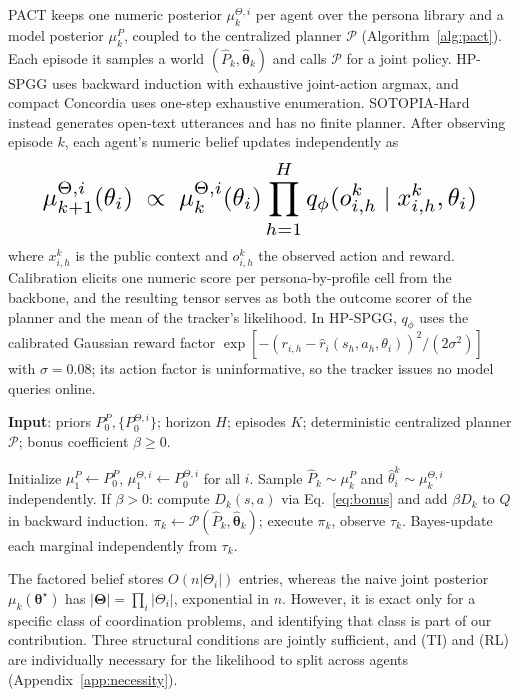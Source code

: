 \documentclass[letterpaper]{article} %
\begin{document}
PACT keeps one numeric posterior $\mu_k^{\Theta,i}$ per agent over the persona library and a model posterior $\mu_k^P$, coupled to the centralized planner $\mathcal P$ (Algorithm~\ref{alg:pact}). Each episode it samples a world $(\hat P_k, \hat{\boldsymbol\theta}_k)$ and calls $\mathcal P$ for a joint policy. HP-SPGG uses backward induction with exhaustive joint-action argmax, and compact Concordia uses one-step exhaustive enumeration. SOTOPIA-Hard instead generates open-text utterances and has no finite planner. After observing episode $k$, each agent's numeric belief updates independently as
\begin{equation}
\label{eq:likelihood}
\resizebox{0.90\linewidth}{!}{$\displaystyle
\mu_{k+1}^{\Theta,i}(\theta_i) \;\propto\; \mu_k^{\Theta,i}(\theta_i)\prod_{h=1}^{H} q_\phi(o_{i,h}^k\mid x_{i,h}^k,\theta_i)
$}
\end{equation}
where $x_{i,h}^k$ is the public context and $o_{i,h}^k$ the observed action and reward. Calibration elicits one numeric score per persona-by-profile cell from the backbone, and the resulting tensor serves as both the outcome scorer of the planner and the mean of the tracker's likelihood. In HP-SPGG, $q_\phi$ uses the calibrated Gaussian reward factor $\exp[-(r_{i,h}-\hat r_i(s_h,a_h,\theta_i))^2/(2\sigma^2)]$ with $\sigma{=}0.08$; its action factor is uninformative, so the tracker issues no model queries online.

\begin{algorithm}[t]
\caption{PACT (idealized PACT\textsuperscript{+} uses Eq.~\ref{eq:bonus}; experiments use the disclosed proxy)}\label{alg:pact}
\textbf{Input}: priors $P_0^P, \{P_0^{\Theta,i}\}$; horizon $H$; episodes $K$; deterministic centralized planner $\mathcal P$; bonus coefficient $\beta\geq 0$.\\
\begin{algorithmic}[1]
\STATE Initialize $\mu_1^P\!\gets\! P_0^P$, $\mu_1^{\Theta,i}\!\gets\! P_0^{\Theta,i}$ for all $i$.
  \STATE Sample $\hat P_k\!\sim\!\mu_k^P$ and $\hat\theta_i^k\!\sim\!\mu_k^{\Theta,i}$ independently.
  \STATE If $\beta>0$: compute $D_k(s,a)$ via Eq.~\eqref{eq:bonus} and add $\beta D_k$ to $Q$ in backward induction.
  \STATE $\pi_k\gets\mathcal P(\hat P_k,\hat{\boldsymbol\theta}_k)$; execute $\pi_k$, observe $\tau_k$.
  \STATE Bayes-update each marginal independently from $\tau_k$.
\ENDFOR
\end{algorithmic}
\end{algorithm}

The factored belief stores $O(n|\Theta_i|)$ entries, whereas the naive joint posterior $\mu_k(\boldsymbol\theta^\star)$ has $|\boldsymbol\Theta| = \prod_i |\Theta_i|$, exponential in $n$. However, it is exact only for a specific class of coordination problems, and identifying that class is part of our contribution. Three structural conditions are jointly sufficient, and (TI) and (RL) are individually necessary for the likelihood to split across agents (Appendix~\ref{app:necessity}).
\end{document}
